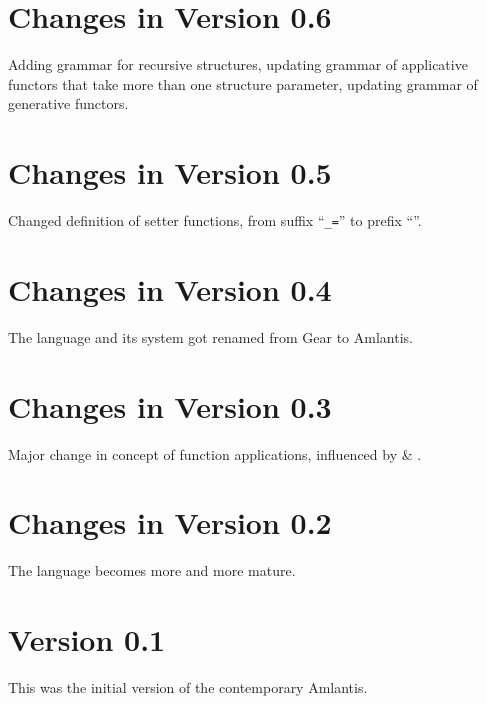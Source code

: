 \section*{Changes in Version 0.6}

Adding grammar for recursive structures, updating grammar of applicative functors that take more than one structure parameter, updating grammar of generative functors.  

\section*{Changes in Version 0.5}

Changed definition of setter functions, from suffix ``\lstinline!_=!'' to prefix ``''. 

\section*{Changes in Version 0.4}

The language and its system got renamed from Gear to Amlantis. 

\section*{Changes in Version 0.3}

Major change in concept of function applications, influenced by  \& . 

\section*{Changes in Version 0.2}

The language becomes more and more mature.

\section*{Version 0.1}

This was the initial version of the contemporary Amlantis. 
